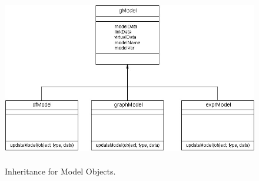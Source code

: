 \documentclass{article}[11pt]
\newcommand{\Rfunction}[1]{{\textsf{#1}}}
\newcommand{\Rpackage}[1]{{\textit{#1}}}
\newcommand{\Rslot}[1]{\textsl{#1}}
\newcommand{\Rclass}[1]{\texttt{#1}}
\begin{document}


\begin{figure}[ht]
  \begin{center}
    \includegraphics[height=3in, width=4.7in]{ModelClass.jpg}
    \caption{ Inheritance for Model Objects. }
    \label{Fig:Model}
  \end{center}
\end{figure}


\end{document}
